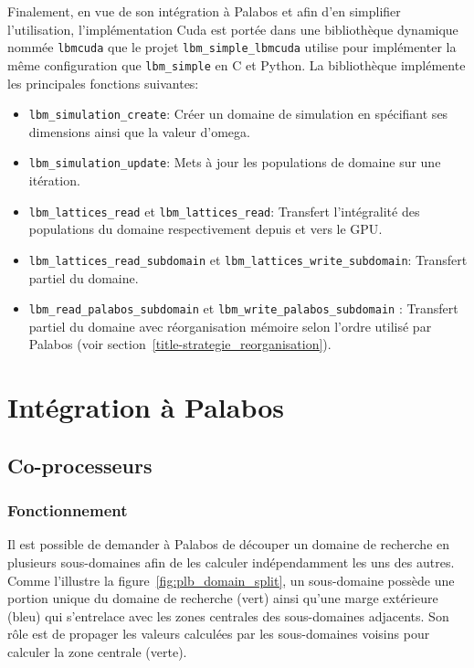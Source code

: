 Finalement, en vue de son intégration à Palabos et afin d'en simplifier l'utilisation, l'implémentation Cuda est portée dans une bibliothèque dynamique nommée \texttt{lbmcuda} que le projet \texttt{lbm\_simple\_lbmcuda} utilise pour implémenter la même configuration que \texttt{lbm\_simple} en C et Python. La bibliothèque implémente les principales fonctions suivantes:

\begin{itemize}
\item \texttt{lbm\_simulation\_create}: Créer un domaine de simulation en spécifiant ses dimensions ainsi que la valeur d'omega.
\item \texttt{lbm\_simulation\_update}: Mets à jour les populations de domaine sur une itération.
\item \texttt{lbm\_lattices\_read} et \texttt{lbm\_lattices\_read}: Transfert l'intégralité des populations du domaine respectivement depuis et vers le \acs{GPU}.
\item \texttt{lbm\_lattices\_read\_subdomain} et \texttt{lbm\_lattices\_write\_subdomain}: Transfert partiel du domaine.
\item \texttt{lbm\_read\_palabos\_subdomain} et \texttt{lbm\_write\_palabos\_subdomain} : Transfert partiel du domaine avec réorganisation mémoire selon l'ordre utilisé par Palabos (voir section~\ref{title-strategie_reorganisation}).
\end{itemize}

\section{Intégration à Palabos}
\subsection{Co-processeurs}
\subsubsection{Fonctionnement}
Il est possible de demander à Palabos de découper un domaine de recherche en plusieurs sous-domaines afin de les calculer indépendamment les uns des autres. Comme l'illustre la figure~\ref{fig:plb_domain_split}, un sous-domaine possède une portion unique du domaine de recherche (vert) ainsi qu'une marge extérieure (bleu) qui s'entrelace avec les zones centrales des sous-domaines adjacents. Son rôle est de propager les valeurs calculées par les sous-domaines voisins pour calculer la zone centrale (verte).

